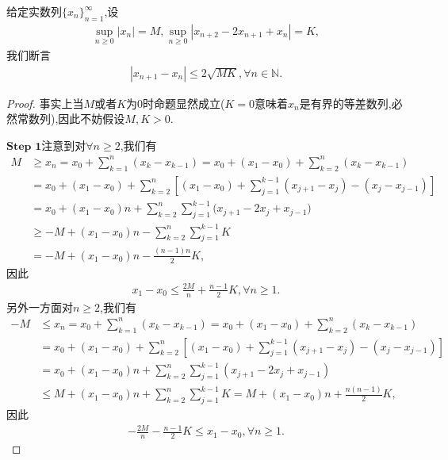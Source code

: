 \documentclass[../../main.tex]{subfiles}%
\begin{document}
\begin{proposition}[数列内插]\label{proposition:数列内插}
给定实数列$\{x_n\}_{n=1}^\infty$,设
\begin{align*}
\sup_{n \geqslant 0} |x_n| = M, \sup_{n \geqslant 0} |x_{n+2} - 2x_{n+1} + x_n| = K,
\end{align*}
我们断言
\begin{align*}
|x_{n+1} - x_n| \leqslant 2\sqrt{MK}, \forall n \in \mathbb{N}.
\end{align*}
\end{proposition}
\begin{proof}

事实上当$M$或者$K$为0时命题显然成立($K=0$意味着$x_n$是有界的等差数列,必然常数列),因此不妨假设$M,K>0$.

$\mathbf{Step}\,\,\mathbf{1}$注意到对$\forall n \geqslant 2$,我们有
\begin{align*}
M&\geqslant x_n=x_0+\sum_{k=1}^n{\left( x_k-x_{k-1} \right)}=x_0+\left( x_1-x_0 \right) +\sum_{k=2}^n{\left( x_k-x_{k-1} \right)}
\\
&=x_0+\left( x_1-x_0 \right) +\sum_{k=2}^n{\left[ \left( x_1-x_0 \right) +\sum_{j=1}^{k-1}{\left( x_{j+1}-x_j \right) -\left( x_j-x_{j-1} \right)} \right]}
\\
&=x_0+(x_1-x_0)n+\sum_{k=2}^n{\sum_{j=1}^{k-1}{(x_{j+1}}}-2x_j+x_{j-1})
\\
&\geqslant -M+(x_1-x_0)n-\sum_{k=2}^n{\sum_{j=1}^{k-1}{K}}
\\
&=-M+(x_1-x_0)n-\frac{(n-1)n}{2}K,
\end{align*}
因此
\begin{align*}
x_1 - x_0 \leqslant \frac{2M}{n} + \frac{n-1}{2}K, \forall n \geqslant 1.
\end{align*}
另外一方面对$n \geqslant 2$,我们有
\begin{align*}
-M&\leqslant x_n=x_0+\sum_{k=1}^n{\left( x_k-x_{k-1} \right)}=x_0+\left( x_1-x_0 \right) +\sum_{k=2}^n{\left( x_k-x_{k-1} \right)}
\\
&=x_0+\left( x_1-x_0 \right) +\sum_{k=2}^n{\left[ \left( x_1-x_0 \right) +\sum_{j=1}^{k-1}{\left( x_{j+1}-x_j \right) -\left( x_j-x_{j-1} \right)} \right]}
\\
&=x_0+(x_1-x_0)n+\sum_{k=2}^n{\sum_{j=1}^{k-1}{(x_{j+1}-2x_j+x_{j-1})}}
\\
&\leqslant M+(x_1-x_0)n+\sum_{k=2}^n{\sum_{j=1}^{k-1}{K=M}}+(x_1-x_0)n+\frac{n(n-1)}{2}K,
\end{align*}
因此
\begin{align*}
-\frac{2M}{n} - \frac{n-1}{2}K \leqslant x_1 - x_0, \forall n \geqslant 1.

\end{align*}
\end{proof}
\end{document}
